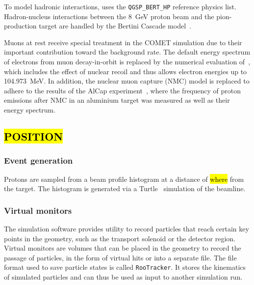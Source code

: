 To model hadronic interactions, \SimG uses the \texttt{QGSP\_BERT\_HP} reference physics list. Hadron-nucleus interactions between the \SI{8}{\GeV} proton beam and the pion-production target are handled by the Bertini Cascade model~\cite{WRIGHT2015175}.

Muons at rest receive special treatment in the COMET simulation due to their important contribution toward the background rate. The default energy spectrum of electrons from muon decay-in-orbit is replaced by the numerical evaluation of~\cite{czarnecki}, which includes the effect of nuclear recoil and thus allows electron energies up to \SI{104.973}{\MeV}. In addition, the nuclear muon capture (NMC) model is replaced to adhere to the results of the AlCap experiment~\cite{litchfield2015status}, where the frequency of proton emissions after NMC in an aluminium target was measured as well as their energy spectrum.


\subsection{\hl{POSITION}}
\subsubsection{Event generation}
Protons are sampled from a beam profile histogram at a distance of \hl{where} from the target. The histogram is generated via a Turtle~\cite{rohrer} simulation of the beamline. %


\subsubsection{Virtual monitors}
The simulation software provides utility to record particles that reach certain key points in the geometry, such as the transport solenoid or the detector region. Virtual monitors are volumes that can be placed in the geometry to record the passage of particles, in the form of virtual hits or into a separate file. The file format used to save particle states is called \texttt{RooTracker}. It stores the kinematics of simulated particles and can thus be used as input to another simulation run. %

